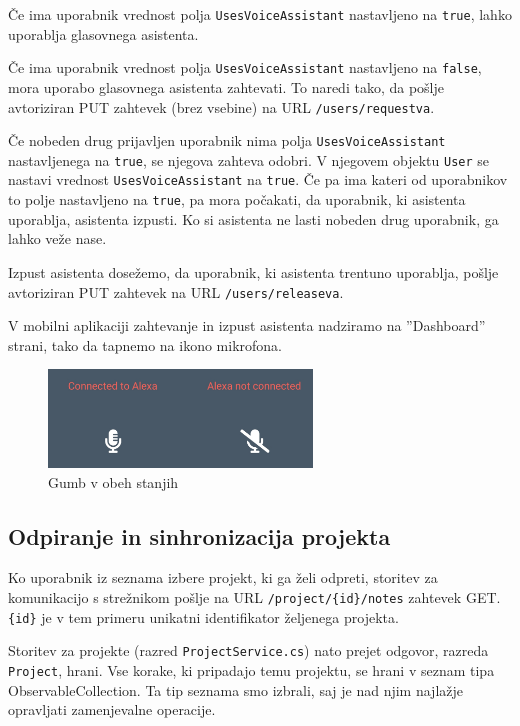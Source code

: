\documentclass[a4paper, 12pt]{book}
\begin{document}
Če ima uporabnik vrednost polja \texttt{UsesVoiceAssistant} nastavljeno na \texttt{true}, lahko uporablja glasovnega asistenta.

Če ima uporabnik vrednost polja \texttt{UsesVoiceAssistant} nastavljeno na \texttt{false}, mora uporabo glasovnega asistenta zahtevati.
To naredi tako, da pošlje avtoriziran PUT zahtevek (brez vsebine) na URL \texttt{/users/requestva}.

Če nobeden drug prijavljen uporabnik nima polja \texttt{UsesVoiceAssistant} nastavljenega na \texttt{true}, se njegova zahteva odobri.
V njegovem objektu \texttt{User} se nastavi vrednost \texttt{UsesVoiceAssistant} na \texttt{true}.
Če pa ima kateri od uporabnikov to polje nastavljeno na \texttt{true}, pa mora počakati, da uporabnik, ki asistenta uporablja, asistenta izpusti.
Ko si asistenta ne lasti nobeden drug uporabnik, ga lahko veže nase.

Izpust asistenta dosežemo, da uporabnik, ki asistenta trentuno uporablja, pošlje avtoriziran PUT zahtevek na URL \texttt{/users/releaseva}.

V mobilni aplikaciji zahtevanje in izpust asistenta nadziramo na ''Dashboard'' strani, tako da tapnemo na ikono mikrofona.

\begin{figure}[H]
\begin{center}
\includegraphics[width=7cm]{app_alexa_yesno}
\end{center}
	\caption{Gumb v obeh stanjih}
\label{app_alexa_yesno}
\end{figure}

\subsection{Odpiranje in sinhronizacija projekta}

Ko uporabnik iz seznama izbere projekt, ki ga želi odpreti, storitev za komunikacijo s strežnikom pošlje na URL \texttt{/project/\{id\}/notes} zahtevek GET.
\texttt{\{id\}} je v tem primeru unikatni identifikator željenega projekta.

Storitev za projekte (razred \texttt{ProjectService.cs}) nato prejet odgovor, razreda \texttt{Project}, hrani.
Vse korake, ki pripadajo temu projektu, se hrani v seznam tipa ObservableCollection.
Ta tip seznama smo izbrali, saj je nad njim najlažje opravljati zamenjevalne operacije.
\end{document}
